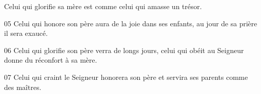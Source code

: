 Celui qui glorifie sa mère est comme celui qui amasse un trésor.

05 Celui qui honore son père aura de la joie dans ses enfants, au jour de sa prière il sera exaucé.

06 Celui qui glorifie son père verra de longs jours, celui qui obéit au Seigneur donne du réconfort à sa mère.

07 Celui qui craint le Seigneur honorera son père et servira ses parents comme des maîtres.
